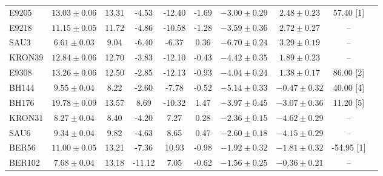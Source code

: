 \documentclass[draft]{aa}
\begin{document}
\begin{appendix}
\begin{table}
\begin{tabular}{lccccccccc}
    E9205 & $13.03 \pm 0.06$ & 13.31 & -4.53 & -12.40 & -1.69 & $-3.00 \pm 0.29$ & $2.48 \pm 0.23$ & 57.40 [1]\\
    E9218 & $11.15 \pm 0.05$ & 11.72 & -4.86 & -10.58 & -1.28 & $-3.59 \pm 0.36$ & $2.72 \pm 0.27$ &  --\\
    SAU3 & $6.61 \pm 0.03$ & 9.04 & -6.40 & -6.37 & 0.36 & $-6.70 \pm 0.24$ & $3.29 \pm 0.19$ & --\\
    KRON39 & $12.84 \pm 0.06$ & 12.70 & -3.83 & -12.10 & -0.43 & $-4.42 \pm 0.35$ & $1.89 \pm 0.23$ & --\\
    E9308 & $13.26 \pm 0.06$ & 12.50 & -2.85 & -12.13 & -0.93 & $-4.04 \pm 0.24$ & $1.38 \pm 0.17$ & 86.00 [2]\\
    BH144 & $9.55 \pm 0.04$ & 8.22 & -2.60 & -7.78 & -0.52 & $-5.14 \pm 0.33$ & $-0.47 \pm 0.32$ & 40.00 [4]\\
    BH176 & $19.78 \pm 0.09$ & 13.57 & 8.69 & -10.32 & 1.47 & $-3.97 \pm 0.45$ & $-3.07 \pm 0.36$ & 11.20 [5]\\
    KRON31 & $8.27 \pm 0.04$ & 8.40 & -4.20 & 7.27 & 0.28 & $-2.36 \pm 0.15$ & $-4.62 \pm 0.29$ & --\\
    SAU6 & $9.34 \pm 0.04$ & 9.82 & -4.63 & 8.65 & 0.47 & $-2.60 \pm 0.18$ & $-4.15 \pm 0.29$ & --\\
    BER56 & $11.00 \pm 0.05$ & 13.21 & -7.36 & 10.93 & -0.98 & $-1.92 \pm 0.32$ & $-1.81 \pm 0.32$ & -54.95 [1]\\
    BER102 & $7.68 \pm 0.04$ & 13.18 & -11.12 & 7.05 & -0.62 & $-1.56 \pm 0.25$ & $-0.36 \pm 0.21$ & --\\
    \hline
    \end{tabular}
  \end{table}

\end{appendix}
\end{document}
